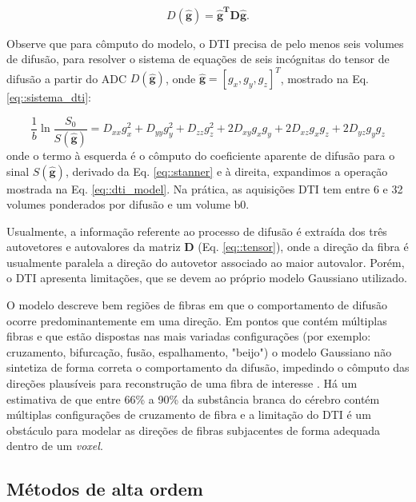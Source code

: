 \documentclass[
    12pt,                %
    oneside,            %
    a4paper,            %
    english,            %
    french,                %
    spanish,            %
    brazil                %
    ]{abntex2}
\begin{document}
\begin{equation}
\label{eq::dti_model}
    D(\mathbf{\hat{g}}) = \mathbf{\hat{g}^T}\mathbf{D}\mathbf{\hat{g}}.
\end{equation}

Observe que para cômputo do modelo, o DTI precisa de pelo menos seis volumes de difusão, para resolver o sistema de equações de seis incógnitas do tensor de difusão a partir do ADC $D(\mathbf{\hat{g}})$, onde $\mathbf{\hat{g}} = [g_x, g_y, g_z]^T$, mostrado na Eq. \ref{eq::sistema_dti}:

\begin{equation}
\label{eq::sistema_dti}
\frac{1}{b}\ln{\frac{S_0}{S(\mathbf{\hat{g}})}}=D_{x x} g_{x}^{2} +D_{y y} g_{y}^{2}+D_{z z} g_{z}^{2}+2 D_{x y} g_{x} g_{y} +2 D_{x z} g_{x} g_{z}+2 D_{y z} g_{y} g_{z}
\end{equation}
onde o termo à esquerda é o cômputo do coeficiente aparente de difusão para o sinal $S(\mathbf{\hat{g}})$, derivado da Eq. \ref{eq::stanner} e à direita, expandimos a operação mostrada na Eq. \ref{eq::dti_model}. Na prática, as aquisições DTI tem entre 6 e 32 volumes ponderados por difusão e um volume b0. 

Usualmente, a informação referente ao processo de difusão é extraída dos três autovetores e autovalores da matriz $\mathbf{D}$ (Eq. \ref{eq::tensor}), onde a direção da fibra é usualmente paralela a direção do autovetor associado ao maior autovalor.
Porém, o DTI apresenta limitações, que se devem ao próprio modelo Gaussiano utilizado.

O modelo descreve bem regiões de fibras em que o comportamento de difusão ocorre predominantemente em uma direção. Em pontos que contém múltiplas fibras e que estão dispostas nas mais variadas configurações (por exemplo: cruzamento, bifurcação, fusão, espalhamento, "beijo") o modelo Gaussiano não sintetiza de forma correta o comportamento da difusão, impedindo o cômputo das direções plausíveis para reconstrução de uma fibra de interesse \cite{fillard2011, daducci2014}. Há um estimativa de que entre 66\% a 90\% da substância branca do cérebro contém múltiplas configurações de cruzamento de fibra \cite{descoteaux2015} e a limitação do DTI é um obstáculo para modelar as direções de fibras subjacentes de forma adequada dentro de um \textit{voxel}.

\subsection{Métodos de alta ordem}
\end{document}
